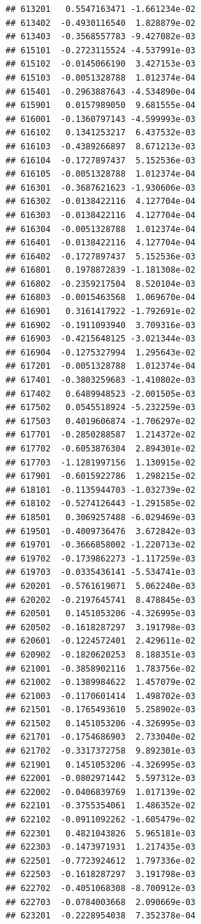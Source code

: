 \begin{frame}[fragile]
\begin{verbatim}
## 613201   0.5547163471 -1.661234e-02
## 613402  -0.4930116540  1.828879e-02
## 613403  -0.3568557783 -9.427082e-03
## 615101  -0.2723115524 -4.537991e-03
## 615102  -0.0145066190  3.427153e-03
## 615103  -0.0051328788  1.012374e-04
## 615401  -0.2963887643 -4.534890e-04
## 615901   0.0157989050  9.681555e-04
## 616001  -0.1360797143 -4.599993e-03
## 616102   0.1341253217  6.437532e-03
## 616103  -0.4389266897  8.671213e-03
## 616104  -0.1727897437  5.152536e-03
## 616105  -0.0051328788  1.012374e-04
## 616301  -0.3687621623 -1.930606e-03
## 616302  -0.0138422116  4.127704e-04
## 616303  -0.0138422116  4.127704e-04
## 616304  -0.0051328788  1.012374e-04
## 616401  -0.0138422116  4.127704e-04
## 616402  -0.1727897437  5.152536e-03
## 616801   0.1978872839 -1.181308e-02
## 616802  -0.2359217504  8.520104e-03
## 616803  -0.0015463568  1.069670e-04
## 616901   0.3161417922 -1.792691e-02
## 616902  -0.1911093940  3.709316e-03
## 616903  -0.4215648125 -3.021344e-03
## 616904  -0.1275327994  1.295643e-02
## 617201  -0.0051328788  1.012374e-04
## 617401  -0.3803259683 -1.410802e-03
## 617402   0.6489948523 -2.001505e-03
## 617502   0.0545518924 -5.232259e-03
## 617503   0.4019606874 -1.706297e-02
## 617701  -0.2850288587  1.214372e-02
## 617702  -0.6053876304  2.894301e-02
## 617703  -1.1281997156  1.130915e-02
## 617901  -0.6015922786  1.298215e-02
## 618101  -0.1135944703 -1.032739e-02
## 618102  -0.5274126443 -1.291585e-02
## 618501   0.3069257488 -6.029469e-03
## 619501  -0.4009736476  3.672842e-03
## 619701  -0.3666858002 -1.220713e-02
## 619702  -0.1739862273 -1.117259e-03
## 619703  -0.0335436141 -5.534741e-03
## 620201  -0.5761619071  5.062240e-03
## 620202  -0.2197645741  8.478845e-03
## 620501   0.1451053206 -4.326995e-03
## 620502  -0.1618287297  3.191798e-03
## 620601  -0.1224572401  2.429611e-02
## 620902  -0.1820620253  8.188351e-03
## 621001  -0.3858902116  1.783756e-02
## 621002  -0.1389984622  1.457079e-02
## 621003  -0.1170601414  1.498702e-03
## 621501  -0.1765493610  5.258902e-03
## 621502   0.1451053206 -4.326995e-03
## 621701  -0.1754686903  2.733040e-02
## 621702  -0.3317372758  9.892301e-03
## 621901   0.1451053206 -4.326995e-03
## 622001  -0.0802971442  5.597312e-03
## 622002  -0.0406839769  1.017139e-02
## 622101  -0.3755354061  1.486352e-02
## 622102  -0.0911092262 -1.605479e-02
## 622301   0.4821043826  5.965181e-03
## 622303  -0.1473971931  1.217435e-03
## 622501  -0.7723924612  1.797336e-02
## 622503  -0.1618287297  3.191798e-03
## 622702  -0.4051068308 -8.700912e-03
## 622703  -0.0784003668  2.090669e-03
## 623201  -0.2228954038  7.352378e-04

\end{verbatim}
\end{frame}
